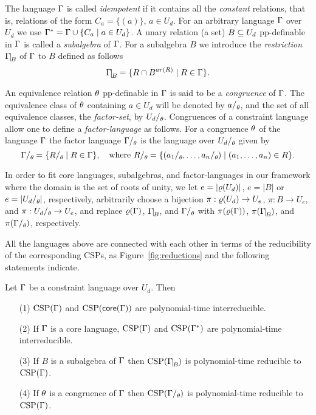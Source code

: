 The language $\Gamma$ is called \emph{idempotent} if it contains all the \emph{constant} relations, that is, relations of the form $C_a=\{(a)\}$, $a\in U_d$. For an arbitrary language $\Gamma$ over $U_d$ we use $\Gamma^*=\Gamma\cup\{C_a\mid a\in U_d\}$.  A unary relation (a set) $B\subseteq U_d$ pp-definable in $\Gamma$ is called a \emph{subalgebra} of $\Gamma$. For a subalgebra $B$ we introduce the \emph{restriction} $\Gm\red B$ of $\Gamma$ to $B$ defined as follows
 \[
\Gm\red B=\{\rel\cap B^{ar(\rel)}\mid \rel\in\Gm\}.
\]


An equivalence relation $\theta$ pp-definable in $\Gamma$ is said to be a \emph{congruence} of $\Gamma$. The equivalence class of $\theta$ containing $a\in U_d$ will be denoted by $a\fac\th$, and the set of all equivalence classes, the \emph{factor-set}, by $U_d\fac\th$. Congruences of a constraint language allow one to define a \emph{factor-language} as follows. For a congruence $\theta$ of the language $\Gamma$ the factor language $\Gm\fac\th$ is the language over $U_d\fac\th$ given by 
\[
\Gm\fac\th=\{\rel\fac\th\mid \rel\in\Gm\}, \quad\text{where } \rel\fac\th=\{(a_1\fac\th\zd a_n\fac\th)\mid  (\vc an)\in\rel\}.
\]

In order to fit core languages, subalgebras, and factor-languages in our framework where the domain is the set of roots of unity, we let $e=|\varrho(U_d)|$, $e=|B|$ or $e=|U_d\fac\th|$, respectively, arbitrarily choose a bijection $\pi:\varrho(U_d)\to U_e$, $\pi:B\to U_e$, and $\pi:U_d\fac\th\to U_e$, and replace $\varrho(\Gamma)$, $\Gm\red B$, and $\Gm\fac\th$ with $\pi(\varrho(\Gamma))$, $\pi(\Gm\red B)$, and $\pi(\Gm\fac\th)$, respectively. 

All the languages above are connected with each other in terms of the reducibility of the corresponding CSPs, as Figure~\ref{fig:reductions} and the following statements indicate.

\begin{prop}\label{pro:reductions}
Let $\Gamma$ be a constraint language over $U_d$. Then
\begin{itemize}
\item[(1)]
  ${\rm CSP}(\Gamma)$ and ${\rm CSP}(\mathsf{core}(\Gamma))$ are polynomial-time interreducible.
\item[(2)]
If $\Gamma$ is a core language, ${\rm CSP}(\Gamma)$ and ${\rm CSP}(\Gamma^*)$ are polynomial-time interreducible.
\item[(3)]
If $B$ is a subalgebra of $\Gamma$ then $\CSP(\Gm\red B)$ is polynomial-time reducible to ${\rm CSP}(\Gamma)$.
\item[(4)]
If $\theta$ is a congruence of $\Gamma$ then $\CSP(\Gm\fac\th)$ is polynomial-time reducible to ${\rm CSP}(\Gamma)$.
\end{itemize}
\end{prop}

